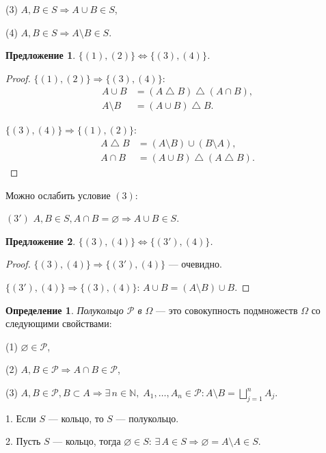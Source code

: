 \documentclass[12pt,titlepage]{article}
\newcounter{tema}
\newtheorem{predl}{Предложение}[tema]
\theoremstyle{definition}
\newtheorem{defen}{Определение}[tema]
\begin{document}
(3) $A, B\in S\Rightarrow A\cup B\in S$,

(4) $A, B\in S\Rightarrow A\setminus B\in S$.

\begin{predl}
$\{(1), (2)\}\Leftrightarrow \{(3), (4)\}$.
\end{predl}

\begin{proof}
$\{(1), (2)\}\Rightarrow \{(3), (4)\}$:
\begin{align*}
A\cup B&=(A\bigtriangleup B)\bigtriangleup(A\cap B),\\
A\setminus B&=(A\cup B)\bigtriangleup B.
\end{align*}

$\{(3), (4)\}\Rightarrow \{(1), (2)\}$:
\begin{align*}
A\bigtriangleup B&=(A\setminus B)\cup (B\setminus A), \\
A\cap B&=(A\cup B)\bigtriangleup (A\bigtriangleup B).
\end{align*}
\end{proof}

Можно ослабить условие $(3)$:

$(3')$ $A, B\in S, A\cap B=\varnothing \Rightarrow A\cup B\in S$.

\begin{predl}
$\{(3), (4)\}\Leftrightarrow \{(3'), (4)\}$.
\end{predl}

\begin{proof}
$\{(3), (4)\}\Rightarrow \{(3'), (4)\}$ --- очевидно.

$\{(3'), (4)\}\Rightarrow \{(3), (4)\}$: $A\cup B=(A\setminus B)\cup
B$.
\end{proof}

\begin{defen}
\emph{Полукольцо $\mathcal{P}$ в $\Omega$} --- это совокупность
подмножеств $\Omega$ со следующими свойствами:

(1) $\varnothing\in \mathcal{P}$,

(2) $A,B\in \mathcal{P}\Rightarrow A\cap B\in\mathcal{P}$,

(3) $A,B\in\mathcal{P}, B\subset A\Rightarrow \exists\,
n\in\mathbb{N}, \; A_1,\ldots,A_n\in\mathcal{P}: A\setminus
B=\bigsqcup\limits_{j=1}^n A_j$.
\end{defen}

1. Если $S$ --- кольцо, то $S$ --- полукольцо.

2. Пусть $S$ --- кольцо, тогда $\varnothing\in S$: $\exists\, A\in
S\Rightarrow \varnothing=A\setminus A\in S$.
\end{document}
